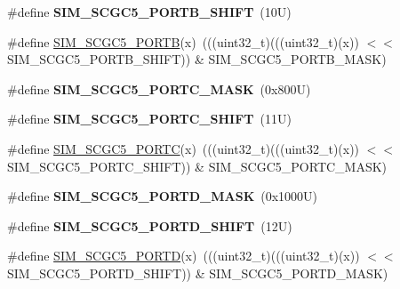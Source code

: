 \begin{DoxyCompactItemize}
\mbox{\label{group___s_i_m___register___masks_ga491c4800f5437a9e2d235a77819e434d}} 
\#define {\bfseries S\+I\+M\+\_\+\+S\+C\+G\+C5\+\_\+\+P\+O\+R\+T\+B\+\_\+\+S\+H\+I\+FT}~(10\+U)
\item 
\#define \mbox{\hyperlink{group___s_i_m___register___masks_gaf3bc60a4a7ab6d478a550ccee752f98d}{S\+I\+M\+\_\+\+S\+C\+G\+C5\+\_\+\+P\+O\+R\+TB}}(x)~(((uint32\+\_\+t)(((uint32\+\_\+t)(x)) $<$$<$ S\+I\+M\+\_\+\+S\+C\+G\+C5\+\_\+\+P\+O\+R\+T\+B\+\_\+\+S\+H\+I\+FT)) \& S\+I\+M\+\_\+\+S\+C\+G\+C5\+\_\+\+P\+O\+R\+T\+B\+\_\+\+M\+A\+SK)
\item 
\mbox{\label{group___s_i_m___register___masks_gaac31449d101ad0d05f2bed682571be35}} 
\#define {\bfseries S\+I\+M\+\_\+\+S\+C\+G\+C5\+\_\+\+P\+O\+R\+T\+C\+\_\+\+M\+A\+SK}~(0x800\+U)
\item 
\mbox{\label{group___s_i_m___register___masks_gae141a6d4af583e7410d0120442b1012f}} 
\#define {\bfseries S\+I\+M\+\_\+\+S\+C\+G\+C5\+\_\+\+P\+O\+R\+T\+C\+\_\+\+S\+H\+I\+FT}~(11\+U)
\item 
\#define \mbox{\hyperlink{group___s_i_m___register___masks_gac46313896b39db20c797f777ecb4efa6}{S\+I\+M\+\_\+\+S\+C\+G\+C5\+\_\+\+P\+O\+R\+TC}}(x)~(((uint32\+\_\+t)(((uint32\+\_\+t)(x)) $<$$<$ S\+I\+M\+\_\+\+S\+C\+G\+C5\+\_\+\+P\+O\+R\+T\+C\+\_\+\+S\+H\+I\+FT)) \& S\+I\+M\+\_\+\+S\+C\+G\+C5\+\_\+\+P\+O\+R\+T\+C\+\_\+\+M\+A\+SK)
\item 
\mbox{\label{group___s_i_m___register___masks_ga723a55222eb5f8fd25da5c956aa50e7b}} 
\#define {\bfseries S\+I\+M\+\_\+\+S\+C\+G\+C5\+\_\+\+P\+O\+R\+T\+D\+\_\+\+M\+A\+SK}~(0x1000\+U)
\item 
\mbox{\label{group___s_i_m___register___masks_gad5f267781fcedf0fcdc0c4d3607c10cb}} 
\#define {\bfseries S\+I\+M\+\_\+\+S\+C\+G\+C5\+\_\+\+P\+O\+R\+T\+D\+\_\+\+S\+H\+I\+FT}~(12\+U)
\item 
\#define \mbox{\hyperlink{group___s_i_m___register___masks_ga2dc18f9c3310f4bc0857d652fc5a0cfb}{S\+I\+M\+\_\+\+S\+C\+G\+C5\+\_\+\+P\+O\+R\+TD}}(x)~(((uint32\+\_\+t)(((uint32\+\_\+t)(x)) $<$$<$ S\+I\+M\+\_\+\+S\+C\+G\+C5\+\_\+\+P\+O\+R\+T\+D\+\_\+\+S\+H\+I\+FT)) \& S\+I\+M\+\_\+\+S\+C\+G\+C5\+\_\+\+P\+O\+R\+T\+D\+\_\+\+M\+A\+SK)
$$
\end{DoxyCompactItemize}
